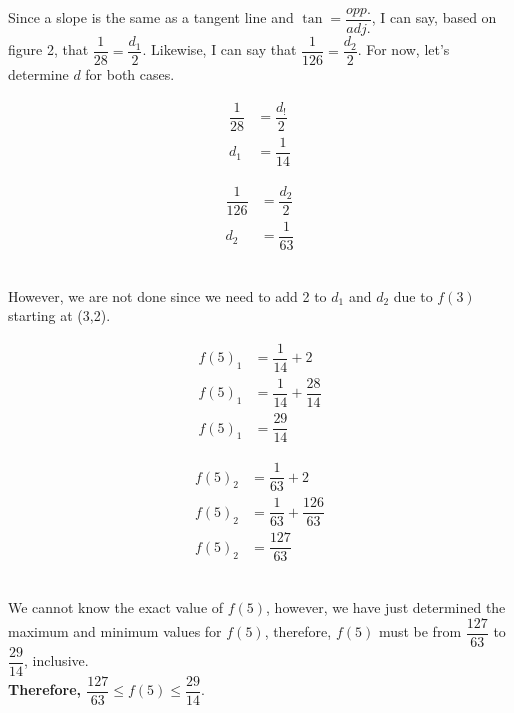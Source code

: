 \documentclass[12pt]{book}
\begin{document}
\begin{enumerate}
\begin{enumerate}
Since a slope is the same as a tangent line and $\tan = \dfrac{opp.}{adj.}$, I can say, based on figure 2, that $\dfrac{1}{28} = \dfrac{d_1}{2}$. Likewise, I can say that $\dfrac{1}{126} = \dfrac{d_2}{2}$. For now, let's determine $d$ for both cases.\\
\begin{minipage}{0.5\textwidth}
    \begin{align*}
        \dfrac{1}{28} &= \dfrac{d_!}{2} \\
        d_1 &= \dfrac{1}{14}
    \end{align*}
\end{minipage}
\begin{minipage}{0.5\textwidth}
    \begin{align*}
        \dfrac{1}{126} &= \dfrac{d_2}{2} \\
        d_2 &= \dfrac{1}{63}
    \end{align*}
\end{minipage}\\

However, we are not done since we need to add 2 to $d_1$ and $d_2$ due to $f(3)$ starting at (3,2).
\begin{minipage}{0.5\textwidth}
    \begin{align*}
        f(5)_1 &= \dfrac{1}{14} + 2 \\
        f(5)_1 &= \dfrac{1}{14} + \dfrac{28}{14} \\
        f(5)_1 &= \dfrac{29}{14}
    \end{align*}
\end{minipage}
\begin{minipage}{0.5\textwidth}
    \begin{align*}
        f(5)_2 &= \dfrac{1}{63} + 2 \\
        f(5)_2 &= \dfrac{1}{63} + \dfrac{126}{63} \\
        f(5)_2 &= \dfrac{127}{63}
    \end{align*}
\end{minipage}\\

We cannot know the exact value of $f(5)$, however, we have just determined the maximum and minimum values for $f(5)$, therefore, $f(5)$ must be from $\dfrac{127}{63}$ to $\dfrac{29}{14}$, inclusive.\\

\textbf{Therefore, $\dfrac{127}{63} \leq f(5) \leq \dfrac{29}{14}$}.


\end{enumerate}


\end{enumerate}
\end{document}
